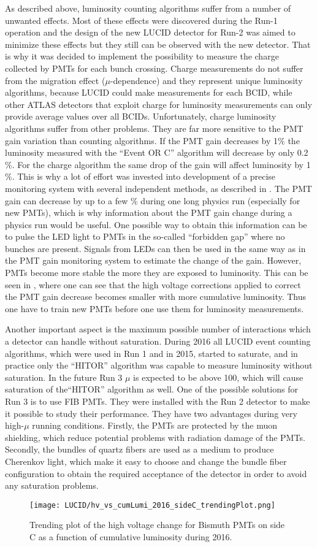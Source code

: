As described above, luminosity counting algorithms suffer from a number of unwanted effects. Most of these effects were discovered during the Run-1 operation and the design of the new LUCID detector for Run-2 was aimed to minimize these effects but they still can be observed with the new detector.
That is why it was decided to implement the possibility to measure the charge collected by PMTs for each bunch crossing.
Charge measurements do not suffer from the migration effect ($\mu$-dependence) and they represent unique luminosity algorithms, because
LUCID could make measurements for each BCID, while other ATLAS detectors that exploit charge for luminosity measurements 
can only provide average values over all BCIDs. Unfortunately, charge luminosity algorithms suffer from other problems.
They are far more sensitive to the PMT gain variation than counting algorithms.
If the PMT gain decreases by 1$\%$ the luminosity measured with the ``Event OR C'' algorithm will decrease by only 0.2$\%$.
For the charge algorithm the same drop of the gain will affect luminosity by 1$\%$.
This is why a lot of effort was invested into development of a precise monitoring system with several independent methods, as described in .
The PMT gain can decrease by up to a few $\%$ during one long physics run (especially for new PMTs), which is why information about the PMT gain change during a physics run would be useful.
One possible way to obtain this information can be to pulse the LED light to PMTs in the so-called ``forbidden gap'' where no bunches are present.
Signals from LEDs can then be used in the same way as in the PMT gain monitoring system to estimate the change of the gain.
However, PMTs become more stable the more they are exposed to luminosity. This can be seen in , where one can see that the high voltage corrections
applied to correct the PMT gain decrease becomes smaller with more cumulative luminosity. Thus one have to train new PMTs before one use them for luminosity measurements.


Another important aspect is the maximum possible number of interactions which a detector can handle without saturation. 
During 2016 all LUCID event counting algorithms, which were used in Run 1 and in 2015, 
started to saturate, and in practice only the ``HITOR'' algorithm was capable to measure luminosity without saturation.
In the future Run 3 $\mu$ is expected to be above 100, which will cause saturation of the``HITOR'' algorithm as well.
One of the possible solutions for Run 3 is to use FIB PMTs. They were installed with the Run 2 detector to make it possible to study their performance.
They have two advantages during very high-$\mu$ running conditions. Firstly, the PMTs are protected by the muon shielding, which reduce potential 
problems with radiation damage of the PMTs. Secondly, the bundles of quartz fibers are used as a medium to produce Cherenkov light, which
make it easy to choose and change the bundle fiber configuration to obtain the required acceptance of the detector in order to avoid any saturation problems.

\begin{figure}
\centering
\texttt{[image: LUCID/hv\_vs\_cumLumi\_2016\_sideC\_trendingPlot.png]}
\caption{
Trending plot of the high voltage change for Bismuth PMTs on side C as a function of cumulative luminosity during 2016.
}
\label{fig:hv_vs_cumLumi}
\end{figure}

